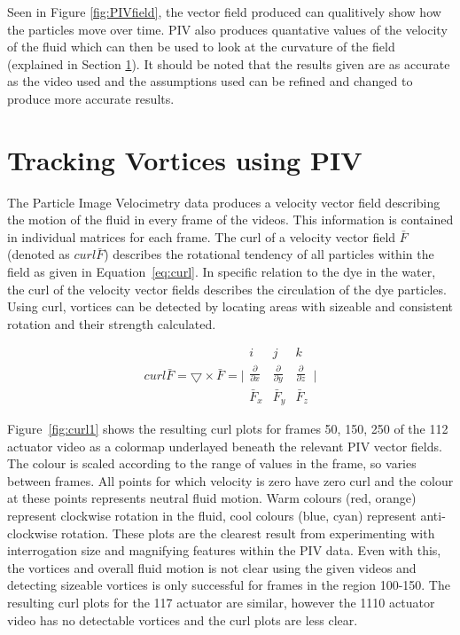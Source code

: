 Seen in Figure \ref{fig:PIVfield}, the vector field produced can qualitively show how the particles move over time. PIV also produces quantative values of the velocity of the fluid which can then be used to look at the curvature of the field (explained in Section \ref{sec:vortices}). It should be noted that the results given are as accurate as the video used and the assumptions used can be refined and changed to produce more accurate results.








\section{Tracking Vortices using PIV}
\label{sec:vortices}


The Particle Image Velocimetry data produces a velocity vector field describing the motion of the fluid in every frame of the videos. This information is contained in individual matrices for each frame. The curl of a velocity vector field $\bar{F}$ (denoted as $curl \bar{F}$) describes the rotational tendency of all particles within the field as given in Equation~\ref{eq:curl}. In specific relation to the dye in the water, the curl of the velocity vector fields describes the circulation of the dye particles. Using curl, vortices can be detected by locating areas with sizeable and consistent rotation and their strength calculated. 


\begin{equation}\label{eq:curl}
curl \bar{F}= \bigtriangledown\times\bar{F} = \Bigg| \begin{matrix}
  	i & j & k \\
  	\frac{\partial}{\partial{x}} & \frac{\partial}{\partial{y}} & \frac{\partial}{\partial{z}} \\
  	\bar{F}_{x} & \bar{F}_{y} & \bar{F}_{z}
	\end{matrix} \Bigg|
\end{equation}

Figure~\ref{fig:curl1} shows the resulting curl plots for frames 50, 150, 250 of the 112 actuator video as a colormap underlayed beneath the relevant PIV vector fields. The colour is scaled according to the range of values in the frame, so varies between frames. All points for which velocity is zero have zero curl and the colour at these points represents neutral fluid motion. Warm colours (red, orange) represent clockwise rotation in the fluid, cool colours (blue, cyan) represent anti-clockwise rotation. These plots are the clearest result from experimenting with interrogation size and magnifying features within the PIV data. Even with this, the vortices and overall fluid motion is not clear using the given videos and detecting sizeable vortices is only successful for frames in the region 100-150. The resulting curl plots for the 117 actuator are similar, however the 1110 actuator video has no detectable vortices and the curl plots are less clear.

